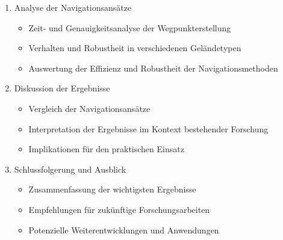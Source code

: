 \begin{enumerate}
    \item Analyse der Navigationsansätze
    \begin{itemize}
        \item Zeit- und Genauigkeitsanalyse der Wegpunkterstellung
        \item Verhalten und Robustheit in verschiedenen Geländetypen
        \item Auswertung der Effizienz und Robustheit der Navigationsmethoden
    \end{itemize}
    
    \item Diskussion der Ergebnisse
    \begin{itemize}
        \item Vergleich der Navigationsansätze
        \item Interpretation der Ergebnisse im Kontext bestehender Forschung
        \item Implikationen für den praktischen Einsatz
    \end{itemize}
    
    \item Schlussfolgerung und Ausblick
    \begin{itemize}
        \item Zusammenfassung der wichtigsten Ergebnisse
        \item Empfehlungen für zukünftige Forschungsarbeiten
        \item Potenzielle Weiterentwicklungen und Anwendungen
    \end{itemize}
\end{enumerate}

